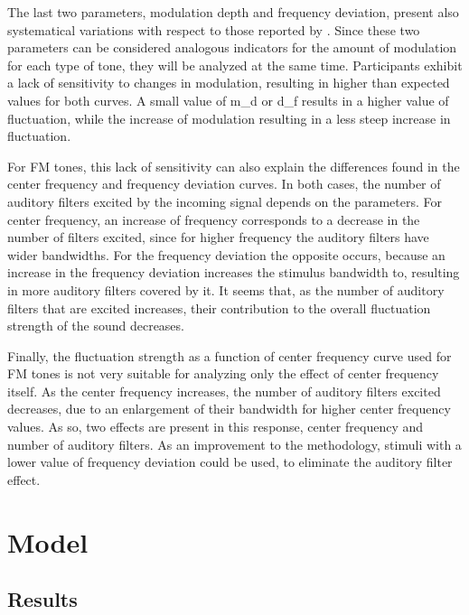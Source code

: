 \documentclass[../main.tex]{subfiles}
\begin{document}
The last two parameters, modulation depth and frequency deviation, present also
systematical variations with respect to those reported by
\citeauthor{Fastl2007Psychoacoustics}. Since these two parameters can be
considered analogous indicators for the amount of modulation for each type of
tone, they will be analyzed at the same time. Participants exhibit a lack of
sensitivity to changes in modulation, resulting in higher than expected values
for both curves. A small value of \gls{m_d} or \gls{d_f} results in a higher
value of fluctuation, while the increase of modulation resulting in a less
steep increase in fluctuation.

For \gls{FM} tones, this lack of sensitivity can also explain the differences
found in the center frequency and frequency deviation curves. In both cases,
the number of auditory filters excited by the incoming signal depends on
the parameters. For center frequency, an increase of frequency corresponds to a
decrease in the number of filters excited, since for higher frequency the
auditory filters have wider bandwidths. For the frequency deviation the opposite
occurs, because an increase in the frequency deviation increases the
stimulus bandwidth to, resulting in more auditory filters covered by it. It
seems that, as the number of auditory filters that are excited increases, their
contribution to the overall fluctuation strength of the sound decreases.

Finally, the fluctuation strength as a function of center frequency curve used
for \gls{FM} tones is not very suitable for analyzing only the effect of center
frequency itself. As the center frequency increases, the number of auditory
filters excited decreases, due to an enlargement of their bandwidth for higher
center frequency values. As so, two effects are present in this response, center
frequency and number of auditory filters. As an improvement to the methodology,
stimuli with a lower value of frequency deviation could be used, to eliminate
the auditory filter effect.

\section{Model}

\subsection{Results}
\end{document}
